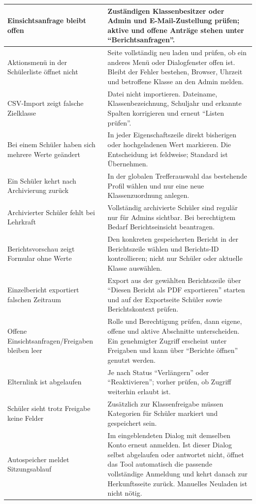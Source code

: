 \documentclass[12pt,a4paper]{article}
\begin{document}
\begin{longtable}{|p{}|p{}|}
\hline
Einsichtsanfrage bleibt offen & Zuständigen Klassenbesitzer oder Admin und E-Mail-Zustellung prüfen; aktive und offene Anträge stehen unter \enquote{Berichtsanfragen}.\\
\hline
Aktionsmenü in der Schülerliste öffnet nicht & Seite vollständig neu laden und prüfen, ob ein anderes Menü oder Dialogfenster offen ist. Bleibt der Fehler bestehen, Browser, Uhrzeit und betroffene Klasse an den Admin melden.\\
\hline
CSV-Import zeigt falsche Zielklasse & Datei nicht importieren. Dateiname, Klassenbezeichnung, Schuljahr und erkannte Spalten korrigieren und erneut \enquote{Listen prüfen}.\\
\hline
Bei einem Schüler haben sich mehrere Werte geändert & In jeder Eigenschaftszeile direkt bisherigen oder hochgeladenen Wert markieren. Die Entscheidung ist feldweise; Standard ist Übernehmen.\\
\hline
Ein Schüler kehrt nach Archivierung zurück & In der globalen Trefferauswahl das bestehende Profil wählen und nur eine neue Klassenzuordnung anlegen.\\
\hline
Archivierter Schüler fehlt bei Lehrkraft & Vollständig archivierte Schüler sind regulär nur für Admins sichtbar. Bei berechtigtem Bedarf Berichtseinsicht beantragen.\\
\hline
Berichtsvorschau zeigt Formular ohne Werte & Den konkreten gespeicherten Bericht in der Berichtszeile wählen und Berichts-ID kontrollieren; nicht nur Schüler oder aktuelle Klasse auswählen.\\
\hline
Einzelbericht exportiert falschen Zeitraum & Export aus der gewählten Berichtszeile über \enquote{Diesen Bericht als PDF exportieren} starten und auf der Exportseite Schüler sowie Berichtskontext prüfen.\\
\hline
Offene Einsichtsanfragen/Freigaben bleiben leer & Rolle und Berechtigung prüfen, dann eigene, offene und aktive Abschnitte unterscheiden. Ein genehmigter Zugriff erscheint unter Freigaben und kann über \enquote{Berichte öffnen} genutzt werden.\\
\hline
Elternlink ist abgelaufen & Je nach Status \enquote{Verlängern} oder \enquote{Reaktivieren}; vorher prüfen, ob Zugriff weiterhin erlaubt ist.\\
\hline
Schüler sieht trotz Freigabe keine Felder & Zusätzlich zur Klassenfreigabe müssen Kategorien für Schüler markiert und gespeichert sein.\\
\hline
Autospeicher meldet Sitzungsablauf & Im eingeblendeten Dialog mit demselben Konto erneut anmelden. Ist dieser Dialog selbst abgelaufen oder antwortet nicht, öffnet das Tool automatisch die passende vollständige Anmeldung und kehrt danach zur Herkunftsseite zurück. Manuelles Neuladen ist nicht nötig.\\

\end{longtable}
\end{document}
